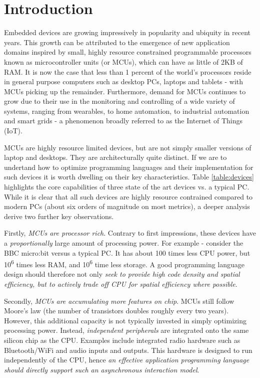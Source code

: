 \section{Introduction}
\label{sec:intro}

Embedded devices are growing impressively in popularity and ubiquity in recent years.
This growth can be attributed to the emergence of new application domains inspired by small, 
highly resource constrained programmable processors known as microcontroller units (or MCUs), 
which can have as little of 2KB of RAM. It is now the case that less than 1 percent of 
the world's processors reside in general purpose computers such as desktop PCs, laptops and tablets 
- with MCUs picking up the remainder.
Furthermore, demand for MCUs continues to grow due to their use in the monitoring and 
controlling of a wide variety of systems, ranging from wearables, to home automation, to 
industrial automation and smart grids - a phenomenon broadly referred to as the Internet of Things (IoT).

MCUs are highly resource limited devices, but are not simply smaller versions of laptop and desktops. 
They are architecturally quite distinct. If we are to undertand how to optimize 
programming languages and their implementation for such devices it is worth dwelling on their key characteristics. 
Table \ref{table:devices} highlights the core capabilities of three state of the art devices vs. a typical PC. While it is clear that all such devices are highly resource contrained compared to modern PCs 
(about six orders of magnitude on most metrics), a deeper analysis derive two further key observations.

Firstly, \emph{MCUs are processor rich}. Contrary to first impressions, these devices have 
a \emph{proportionally} large amount of processing power. For example - consider the BBC micro:bit 
versus a typical PC. It has about 100 times less CPU power, but 10\textsuperscript{6} times less RAM, 
and 10\textsuperscript{6} time less storage. A good programming language design should therefore not 
only \emph{seek to provide high code density and spatial efficiency, 
but to actively trade off CPU for spatial efficiency where possible}. 

Secondly, \emph{MCUs are accumulating more features on chip}. 
MCUs still follow Moore's law (the number of transistors doubles roughly every two years). 
However, this additional capacity is 
not typically invested in simply optimizing processing power. Instead, \emph{independent peripherals} 
are integrated onto the same silicon chip as the CPU. Examples include integrated radio hardware such 
as Bluetooth/WiFi and audio inputs and outputs. This hardware is designed to run independently of the 
CPU, hence \emph{an effective application programming language should directly support such an asynchronous
interaction model}.

